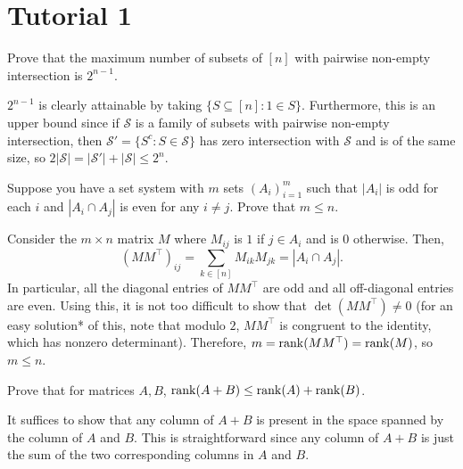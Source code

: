 \documentclass{article}
\begin{document}
\thispagestyle{empty}
\titleBC

\tableofcontents

\vspace{1cm}

\clearpage

\section{Tutorial 1}

	\begin{exercise}
		Prove that the maximum number of subsets of $[n]$ with pairwise non-empty intersection is $2^{n-1}$.
	\end{exercise}
	\begin{solution*}
		$2^{n-1}$ is clearly attainable by taking $\{S \subseteq [n] : 1 \in S\}$. Furthermore, this is an upper bound since if $\mathcal{S}$ is a family of subsets with pairwise non-empty intersection, then $\mathcal{S}' = \{S^c : S \in \mathcal{S}\}$ has zero intersection with $\mathcal{S}$ and is of the same size, so $2|\mathcal{S}| = |\mathcal{S}'|+|\mathcal{S}| \le 2^n$.
	\end{solution*}

	\begin{exercise}
		\label{ex1.2}
		Suppose you have a set system with $m$ sets $(A_i)_{i=1}^m$ such that $|A_i|$ is odd for each $i$ and $|A_i \cap A_j|$ is even for any $i \ne j$. Prove that $m \le n$.
	\end{exercise}
	\begin{solution*}
		Consider the $m \times n$ matrix $M$ where $M_{ij}$ is $1$ if $j \in A_i$ and is $0$ otherwise. Then,
		\[ (MM^\top)_{ij} = \sum_{k \in [n]} M_{ik} M_{jk} = |A_i \cap A_j|. \]
		In particular, all the diagonal entries of $MM^\top$ are odd and all off-diagonal entries are even. Using this, it is not too difficult to show that $\det(MM^\top) \ne 0$ (for an easy solution* of this, note that modulo $2$, $MM^\top$ is congruent to the identity, which has nonzero determinant). Therefore, $m = \operatorname{rank}(MM^\top) = \operatorname{rank}(M)$, so $m \le n$.
	\end{solution*}

	\begin{exercise}
		\label{ex1.3}
		Prove that for matrices $A,B$, $\operatorname{rank}(A+B) \le \operatorname{rank}(A)+\operatorname{rank}(B)$.
	\end{exercise}
	\begin{solution*}
		It suffices to show that any column of $A+B$ is present in the space spanned by the column of $A$ and $B$. This is straightforward since any column of $A+B$ is just the sum of the two corresponding columns in $A$ and $B$.
	\end{solution*}
\end{document}
